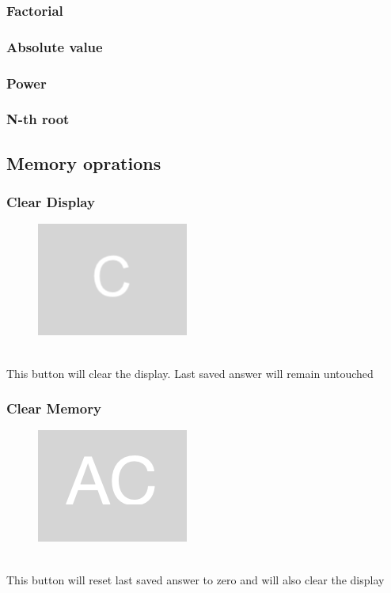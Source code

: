 \documentclass[11pt, a4paper]{article}
\theoremstyle{definition}
\begin{document}
    \subsubsection{Factorial}

    \subsubsection{Absolute value}

    \subsubsection{Power}

    \subsubsection{N-th root}

    \subsection{Memory oprations}

    \subsubsection{Clear Display }

    \begin{figure}[h]
        \includegraphics[scale = 0.2]{clear_display}
        \centering
        \label{fig:ac}
    \end{figure}
    \\
    This button will clear the display. Last saved answer will remain untouched

    \subsubsection{Clear Memory}

    \begin{figure}[h]
        \includegraphics[scale = 0.2]{clear_memory}
        \centering
        \label{fig:c}
    \end{figure}
    \\
    This button will reset last saved answer to zero and will also clear the display
\end{document}
